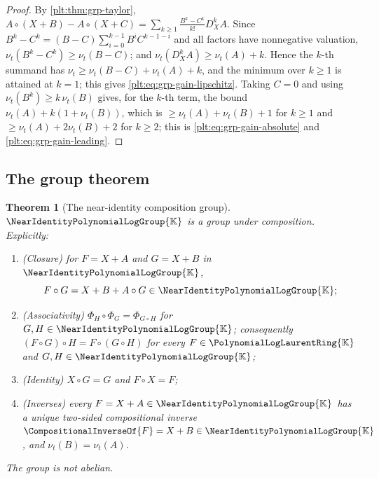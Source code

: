 \documentclass[11pt,oneside]{article}
\theoremstyle{plain}
\newtheorem{theorem}{Theorem}[section]
\theoremstyle{definition}
\theoremstyle{remark}
\newcommand{\K}{\mathbb{K}}
\newcommand{\PLlau}{\PolynomialLogLaurentRing{\K}}       %
\newcommand{\Gnear}{\NearIdentityPolynomialLogGroup{\K}} %
\newcommand{\ordt}{\nu_{t}}                              %
\newcommand{\DX}{D_{X}}                                  %
\newcommand{\compose}{\mathbin{\circ}}
\begin{document}
\begin{proof}
By \cref{plt:thm:grp-taylor},
\(A\compose(X+B)-A\compose(X+C)=\sum_{k\ge1}\frac{B^k-C^k}{k!}\DX^kA\).
Since \(B^k-C^k=(B-C)\sum_{i=0}^{k-1}B^iC^{k-1-i}\) and all factors have
nonnegative valuation, \(\ordt(B^k-C^k)\ge\ordt(B-C)\); and
\(\ordt(\DX^kA)\ge\ordt(A)+k\).  Hence the \(k\)-th summand has
\(\ordt\ge\ordt(B-C)+\ordt(A)+k\), and the minimum over \(k\ge1\) is attained
at \(k=1\); this gives
\eqref{plt:eq:grp-gain-lipschitz}.  Taking \(C=0\) and using
\(\ordt(B^k)\ge k\,\ordt(B)\) gives, for the \(k\)-th term, the bound
\(\ordt(A)+k(1+\ordt(B))\), which is \(\ge\ordt(A)+\ordt(B)+1\) for \(k\ge1\)
and \(\ge\ordt(A)+2\ordt(B)+2\) for \(k\ge2\); this is
\eqref{plt:eq:grp-gain-absolute} and \eqref{plt:eq:grp-gain-leading}.
\end{proof}


\subsection{The group theorem}

\begin{theorem}[The near-identity composition group]\label{plt:thm:grp-group}
\(\Gnear\) is a group under composition.  Explicitly:
\begin{enumerate}
\item \emph{(Closure)} for \(F=X+A\) and \(G=X+B\) in \(\Gnear\),
\begin{equation}\label{plt:eq:grp-closure}
  F\compose G=X+B+A\compose G\in\Gnear;
\end{equation}
\item \emph{(Associativity)} \(\Phi_H\circ\Phi_G=\Phi_{G\compose H}\) for
\(G,H\in\Gnear\); consequently
\((F\compose G)\compose H=F\compose(G\compose H)\) for every \(F\in\PLlau\) and
\(G,H\in\Gnear\);
\item \emph{(Identity)} \(X\compose G=G\) and \(F\compose X=F\);
\item \emph{(Inverses)} every \(F=X+A\in\Gnear\) has a unique two-sided
compositional inverse \(\CompositionalInverseOf{F}=X+B\in\Gnear\), and
\(\ordt(B)=\ordt(A)\).
\end{enumerate}
The group is not abelian.
\end{theorem}
\end{document}
